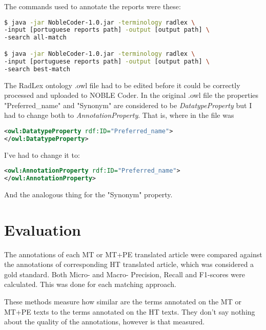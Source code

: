 The commands used to annotate the reports were these:


\begin{lstlisting}[language=bash]
$ java -jar NobleCoder-1.0.jar -terminology radlex \
-input [portuguese reports path] -output [output path] \
-search all-match

$ java -jar NobleCoder-1.0.jar -terminology radlex \
-input [portuguese reports path] -output [output path] \
-search best-match
\end{lstlisting}


The RadLex ontology .owl file had to be edited before it could be correctly processed and uploaded to NOBLE Coder. In the original .owl file the properties  "Preferred\_name" and "Synonym" are considered to be \textit{DatatypeProperty} but I had to change both to \textit{AnnotationProperty}. That is, where in the file was


\begin{lstlisting}[language=xml]
<owl:DatatypeProperty rdf:ID="Preferred_name">
</owl:DatatypeProperty>
\end{lstlisting}


I've had to change it to:


\begin{lstlisting}[language=xml]
<owl:AnnotationProperty rdf:ID="Preferred_name">
</owl:AnnotationProperty>
\end{lstlisting}


And the analogous thing for the "Synonym" property.

\section{Evaluation}

The annotations of each MT or MT+PE translated article were compared against the annotations of corresponding HT translated article, which was considered a gold standard. Both Micro- and Macro- Precision, Recall and F1-scores were calculated. This was done for each matching approach. 

These methods measure how similar are the terms annotated on the MT or MT+PE texts to the terms annotated on the HT texts. They don't say nothing about the quality of the annotations, however is that measured. 





 